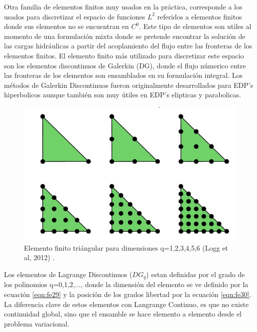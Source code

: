 Otra familia de elementos finitos muy usados en la práctica, corresponde a los usados para discretizar el espacio de funciones $L^{2}$ referidos a elementos finitos donde sus elementos no se encuentran en $C^{0}$. Este tipo de elementos son utiles al momento de una formulación mixta donde se pretende encontrar la solución de las cargas hidráulicas a partir del acoplamiento del flujo entre las fronteras de los elementos finitos. El elemento finito más utilizado para discretizar este espacio son los elementos discontinuos de Galerkin (DG), donde el flujo númerico entre las fronteras de los elementos son ensamblados en su formulación integral. Los métodos de Galerkin Discontinuos fueron originalmente desarrollados para EDP's hiperbolicos aunque también son muy útiles en EDP's elipticas y parabolicas.

\begin{figure}[ht!]
\centering
\includegraphics[scale=0.42]{Figura_19.png}
\caption{ Elemento finito triángular para dimensiones q=1,2,3,4,5,6 (Logg et al, 2012) . }
\label{Figura18:2}
\end{figure}

Los elementos de Lagrange Discontinuos ($DG_{q}$) estan definidas por el grado de los polinomios q=0,1,2,..., donde la dimensión del elemento se ve definido por la ecuación \ref{eqn:fe29} y la posición de los grados libertad por la ecuación \ref{eqn:fe30}. La diferencia clave de estos elementos con Langrange Continuo, es que no existe continuidad global, sino que el ensamble se hace elemento a elemento desde el problema variacional.

